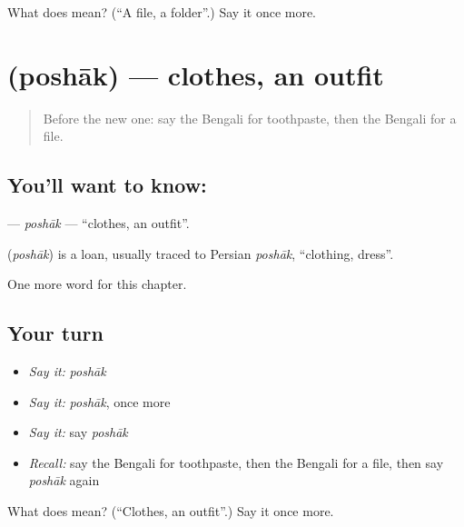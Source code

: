 \begin{tcolorbox}[breakable,colback=teal!4,colframe=teal!35!black,title={Before you move on}]
What does  mean? (\textquotedblleft{}A file, a folder\textquotedblright{}.) Say it once more.
\end{tcolorbox}
\section[\texorpdfstring{\bn{পোশাক} (poshāk)}{পোশাক (poshāk)}]{ (poshāk) — clothes, an outfit}

\label{lesson:BN-C164-poshak}



\begin{quote}
Before the new one: say the Bengali for toothpaste, then the Bengali for a file.
\end{quote}

\subsection*{You'll want to know: }
\textbf{} — \emph{poshāk} — \textquotedblleft{}clothes, an outfit\textquotedblright{}.

\begin{cousinweb}
\textbf{} (\emph{poshāk}) is a loan, usually traced to Persian \emph{poshāk}, \textquotedblleft{}clothing, dress\textquotedblright{}.
\end{cousinweb}

\begin{grammarlens}[title={What you've built}]
One more word for this chapter.
\end{grammarlens}

\subsection*{Your turn}
\begin{itemize}
\raggedright
  \item \emph{Say it:} \emph{poshāk}
  \item \emph{Say it:} \emph{poshāk}, once more
  \item \emph{Say it:} say \emph{poshāk}
  \item \emph{Recall:} say the Bengali for toothpaste, then the Bengali for a file, then say \emph{poshāk} again
\end{itemize}

\begin{tcolorbox}[breakable,colback=teal!4,colframe=teal!35!black,title={Before you move on}]
What does  mean? (\textquotedblleft{}Clothes, an outfit\textquotedblright{}.) Say it once more.
\end{tcolorbox}
